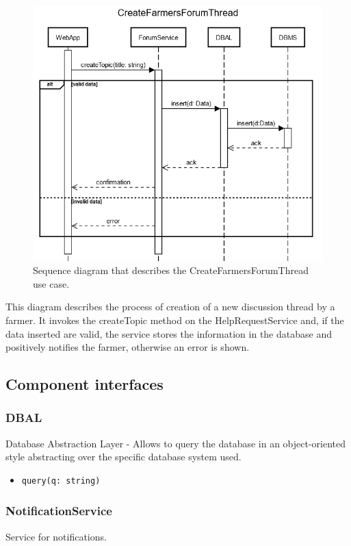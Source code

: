 \documentclass{article}
\begin{document}
\newpage
\begin{figure}[H]
   \centering
   \includegraphics[scale=0.40]{diagrams/sequence diagrams/CreateFarmersForumThread.png}
    \caption{Sequence diagram that describes the CreateFarmersForumThread use case.}
\end{figure}
This diagram describes the process of creation of a new discussion thread by a farmer. It invokes the createTopic method on the HelpRequestService and, if the data inserted are valid, the service stores the information in the database and positively notifies the farmer, otherwise an error is shown.
\newpage
\subsection{Component interfaces}
\subsubsection{DBAL}
Database Abstraction Layer - Allows to query the database in an object-oriented style abstracting over the specific database system used.

\begin{itemize}
\item \begin{verbatim}query(q: string)\end{verbatim}
\end{itemize}

\subsubsection{NotificationService}
Service for notifications.
\end{document}
